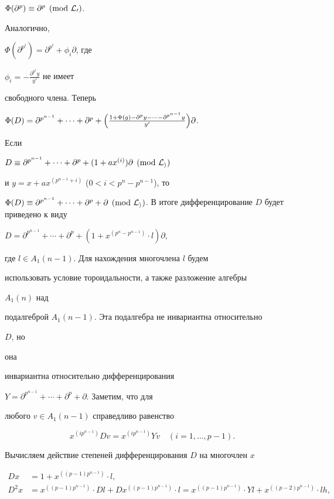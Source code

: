 $\Phi(\partial^p)\equiv\partial^p\pmod{\cal L_0}$.





Аналогично,


$\Phi(\partial^{p^i})=\partial^{p^i}+\phi_i\partial$, где


$\phi_i=-\frac{\partial^{p^i}y}{y'}$ не имеет


свободного члена. Теперь


$\Phi(D)=\partial^{p^{n-1}}+\dotsb+\partial^p+\Bigl(


\frac{1+\Phi(g)-\partial^py-\dotsb-\partial^{p^{n-1}}y}{y'}\Bigr)


\partial$.


Если


$D\equiv\partial^{p^{n-1}}+\dotsb+\partial^p+(1+ax^{(i)})\partial


\pmod{\cal L_i}$


и $y=x+ax^{(p^{n-1}+i)}$ ($0<i<p^n-p^{n-1}$), то


$\Phi(D)\equiv\partial^{p^{n-1}}+\dotsb+\partial^p+\partial


\pmod{\cal L_i}$. В итоге дифференцирование $D$ будет приведено к виду


$D=\partial^{p^{n-1}}+\dotsb+\partial^p+(1+x^{(p^n-p^{n-1})}


\cdot l)\partial$,


где $l\in A_1(n-1)$. Для нахождения многочлена $l$ будем


использовать условие тороидальности, а также разложение алгебры


$A_1(n)$ над


подалгеброй $A_1(n-1)$. Эта подалгебра не инвариантна относительно


$D$, но


она


инвариантна относительно дифференцирования


$Y=\partial^{p^{n-1}}+\dotsb+\partial^p+\partial$. Заметим, что для


любого $v\in A_1(n-1)$ справедливо равенство


$$


x^{(ip^{n-1})}Dv=x^{(ip^{n-1})}Yv\quad (i=1,\dotsc,p-1).


$$


Вычисляем действие степеней дифференцирования $D$ на многочлен $x$


\begin{equation}


\begin{split}


Dx&= 1+x^{((p-1)p^{n-1})}\cdot l,\\


D^2x&=x^{((p-1)p^{n-1})}\cdot Dl+Dx^{((p-1)p^{n-1})}\cdot l=


x^{((p-1)p^{n-1})}\cdot Yl+x^{((p-2)p^{n-1})}\cdot lh,


\end{split}


\end{equation}


